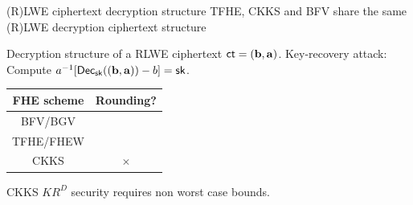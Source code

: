 \documentclass{beamer}
\begin{document}
	\begin{frame}{(R)LWE ciphertext decryption structure}
	TFHE, CKKS and BFV share the same (R)LWE decryption ciphertext structure
	\begin{center}
	\end{center}
		\warning Decryption structure of a RLWE ciphertext $\mathsf{ct}=(\mathbf{b}, \mathbf{a})$.
		Key-recovery attack: Compute $a^{-1} [{\sf Dec}_{\sf sk}((\mathbf{b}, \mathbf{a})) - b] = {\sf sk}$.
		\begin{center}
			\begin{tabular}{|c|c|}
				\hline
				FHE scheme & Rounding? \\
				\hline
				BFV/BGV & \checkmark  \\
				\hline
				TFHE/FHEW & \checkmark  \\
				\hline
				CKKS & $\times$ \\
				\hline
			\end{tabular}
		\end{center}
		CKKS $KR^D$ security requires non worst case bounds.
	\end{frame}
	
\end{document}
